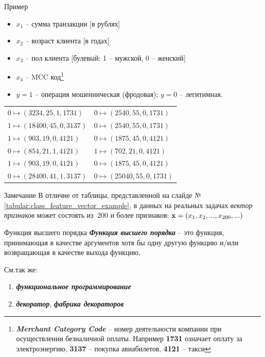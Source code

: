 \documentclass{beamer}
\newcommand{\termdef}[1]{\textbf{\textit{#1}}}
\newcommand{\term}{\textit}
\begin{document}
  \begin{frame}{Пример}
  \begin{itemize}
  	 \item $x_1$ -- сумма транзакции [в рублях]
  	 \item $x_2$ -- возраст клиента [в годах]
  	 \item $x_3$ -- пол клиента [булевый: 1 -- мужской, 0 -- женский]
  	 \item $x_4$ -- MCC код\footnote{\termdef{Merchant Category Code} -- номер деятельности компании при осуществлении безналичной оплаты. Например \textbf{1731} означает оплату за электроэнергию, \textbf{3137} -- покупка авиабилетов, \textbf{4121} -- такси}
  	 \item  $y=1$ -- операция мошенническая (фродовая);  $y=0$ -- легитимная.
  \end{itemize}
  \begin{center}\small \begin{tabular}{ l l }\label{tabular:class_feature_vector_example}
  	$0 \mapsto (3234, 25, 1, 1731) $ &  $0 \mapsto (2540, 55, 0, 1731)$ \\
  	$1 \mapsto (18400, 45, 0, 3137)$ & $0 \mapsto (2540, 55, 0, 1731)$  \\
  	$1 \mapsto (903, 19, 0, 4121)$  & $0 \mapsto (1875, 45, 0, 4121)$  \\
  	$0 \mapsto (854, 21, 1, 4121)$  & $1 \mapsto (702, 21, 0, 4121)$  \\
  	$1 \mapsto (903, 19, 0, 4121)$  & $0 \mapsto (1875, 45, 0, 4121)$  \\
  	$0 \mapsto (28400, 41, 1, 3137)$ & $0 \mapsto (25040, 55, 0, 1731)$  \\
  \end{tabular}\end{center}
  \end{frame}
  
  \begin{frame}
   \begin{block}{Замечание}
	  В отличие от таблицы, представленной на слайде №\ref{tabular:class_feature_vector_example},
	  в данных на реальных задачах \term{вектор признаков} может состоять из $~200$ и более признаков:
	  $\bold x = (x_1, x_2, ..., x_{200}, ...)$
  \end{block}
  \end{frame}
  
  \begin{frame}{Функция высшего порядка}
  \termdef{Функция высшего порядка} -- это функция, принимающая в качестве аргументов хотя бы одну другую функцию и/или возвращающая в качестве выхода функцию.
  
  См.так же:
  \begin{enumerate}
  	\item \termdef{функциональное программирование}
  	\item \termdef{декоратор}, \termdef{фабрика декораторов}
  \end{enumerate}
  
  \end{frame}
  
\end{document}
